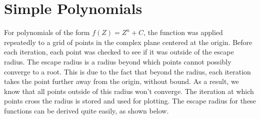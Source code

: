 \documentclass[12pt]{article}
\begin{document}
\section*{Simple Polynomials}
For polynomials of the form $f(Z)= Z^n+C$, the function was applied repeatedly to a grid of points in the complex plane centered at the origin. Before each iteration, each point was checked to see if it was outside of the escape radius. The escape radius is a radius beyond which points cannot possibly converge to a root. This is due to the fact that beyond the radius, each iteration takes the point further away from the origin, without bound. As a result, we know that all points outside of this radius won’t converge. The iteration at which points cross the radius is stored and used for plotting. The escape radius for these functions can be derived quite easily, as shown below.
\end{document}
